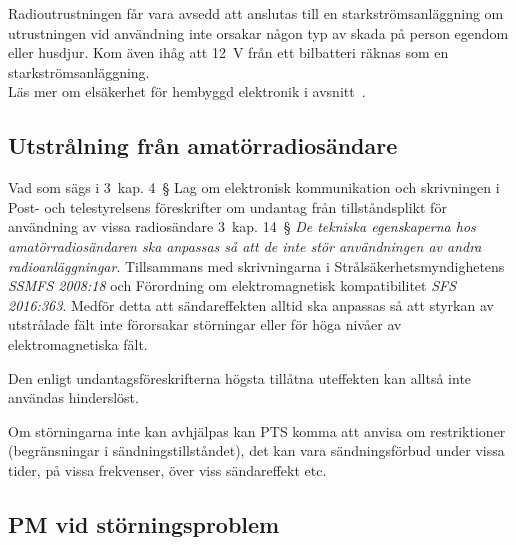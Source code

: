 Radioutrustningen får vara avsedd att anslutas till en starkströmsanläggning
om utrustningen vid användning inte orsakar någon typ av skada på person
egendom eller husdjur.
Kom även ihåg att \qty{12}{\volt} från ett bilbatteri räknas som en
starkströmsanläggning.\\

Läs mer om elsäkerhet för hembyggd elektronik i
avsnitt~.

\subsection{Utstrålning från amatörradiosändare}

Vad som sägs i 3~kap. 4~\S{} Lag om elektronisk kommunikation och skrivningen i
Post- och telestyrelsens föreskrifter om undantag från tillståndsplikt för
användning av vissa radiosändare 3~kap. 14~\S{} \emph{De tekniska egenskaperna hos
	amatörradiosändaren ska anpassas så att de inte stör användningen av andra
	radioanläggningar}.
Tillsammans med skrivningarna i Strålsäkerhetsmyndighetens \emph{SSMFS 2008:18}
och Förordning om elektromagnetisk kompatibilitet \emph{SFS 2016:363}.
Medför detta att sändareffekten alltid ska anpassas så att styrkan av utstrålade
fält inte förorsakar störningar eller för höga nivåer av elektromagnetiska fält.

Den enligt undantagsföreskrifterna högsta tillåtna uteffekten kan alltså inte
användas hinderslöst.

Om störningarna inte kan avhjälpas kan PTS komma att anvisa om restriktioner
(begränsningar i sändningstillståndet), det kan vara sändningsförbud under
vissa tider, på vissa frekvenser, över viss sändareffekt etc.

\subsection{PM vid störningsproblem}

